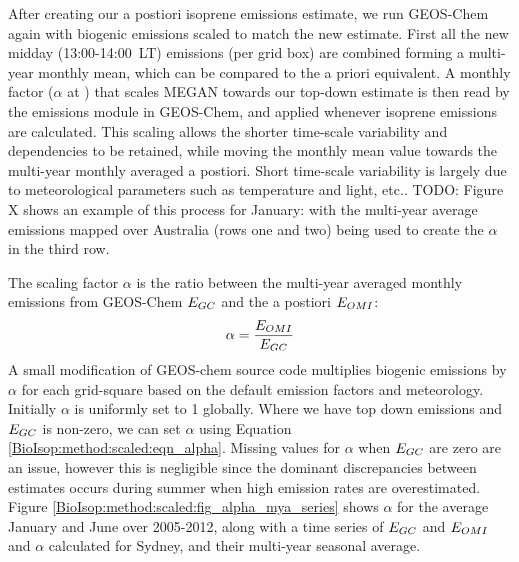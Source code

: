     After creating our a postiori isoprene emissions estimate, we run GEOS-Chem again with biogenic emissions scaled to match the new estimate. 
    First all the new midday (13:00-14:00~LT) emissions (per grid box) are combined forming a multi-year monthly mean, which can be compared to the a priori equivalent.
    A monthly factor ($\alpha$ at \lowhr) that scales MEGAN towards our top-down estimate is then read by the emissions module in GEOS-Chem, and applied whenever isoprene emissions are calculated.
    This scaling allows the shorter time-scale variability and dependencies to be retained, while moving the monthly mean value towards the multi-year monthly averaged a postiori.
    Short time-scale variability is largely due to meteorological parameters such as temperature and light, etc..
    TODO: Figure X shows an example of this process for January: with the multi-year average emissions mapped over Australia (rows one and two) being used to create the $\alpha$ in the third row.
    
    
    The scaling factor $\alpha$ is the ratio between the multi-year averaged monthly emissions from GEOS-Chem $E_{GC}$ and the a postiori $E_{OMI}$: 
    \begin{equation} \label{BioIsop:method:scaled:eqn_alpha}
        \alpha = \frac{E_{OMI}}{E_{GC}}
    \end{equation}
    A small modification of GEOS-chem source code multiplies biogenic emissions by $\alpha$ for each grid-square based on the default emission factors and meteorology.
    Initially $\alpha$ is uniformly set to 1 globally.
    Where we have top down emissions and $E_{GC}$ is non-zero, we can set $\alpha$ using Equation \ref{BioIsop:method:scaled:eqn_alpha}.
    Missing values for $\alpha$ when $E_{GC}$ are zero are an issue, however this is negligible since the dominant discrepancies between estimates occurs during summer when high emission rates are overestimated.
    Figure \ref{BioIsop:method:scaled:fig_alpha_mya_series} shows $\alpha$ for the average January and June over 2005-2012, along with a time series of $E_{GC}$ and $E_{OMI}$ and $\alpha$ calculated for Sydney, and their multi-year seasonal average.
    

